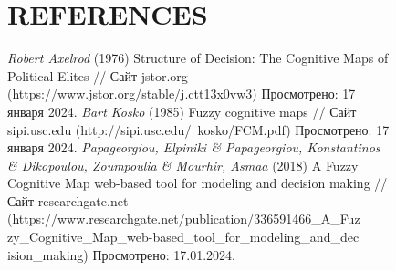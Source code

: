 \documentclass{article}
\begin{document}
\begin{figure}[!t]
\begin{minipage}{0.49\textwidth}
\begin{center}
                \chapter{REFERENCES}
            \end{center}
            \begin{thebibliography}{}
                 \textit{Robert Axelrod} (1976) Structure of Decision: The Cognitive Maps of Political Elites // Сайт jstor.org (https://www.jstor.org/stable/j.ctt13x0vw3) Просмотрено: 17 января 2024.
                 \textit{Bart Kosko} (1985) Fuzzy cognitive maps // Сайт sipi.usc.edu (http://sipi.usc.edu/~kosko/FCM.pdf) Просмотрено: 17 января 2024.
                 \textit{Papageorgiou, Elpiniki \& Papageorgiou, Konstantinos \& Dikopoulou, Zoumpoulia \& Mourhir, Asmaa} (2018) A Fuzzy Cognitive Map web-based tool for modeling and decision making // Сайт researchgate.net (https://www.researchgate.net/publication/336591466\_A\_Fuz\\
                zy\_Cognitive\_Map\_web-based\_tool\_for\_modeling\_and\_dec\\ision\_making) Просмотрено: 17.01.2024.
            \end{thebibliography}
            ~\\
            ~\\
            ~\\
            ~\\
            ~\\
            ~\\
            ~\\
            ~\\
            ~\\
            ~\\
            ~\\
            ~\\
            ~\\
            ~\\
            ~\\
            ~\\
            ~\\
            ~\\
            ~\\
            ~\\
            ~\\
            ~\\
            ~\\
            ~\\

\end{minipage}
\end{figure}
\end{document}
